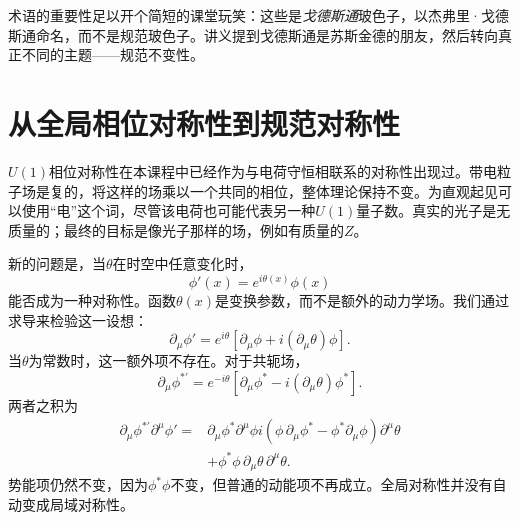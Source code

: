 术语的重要性足以开个简短的课堂玩笑：这些是\emph{戈德斯通}玻色子，以杰弗里·戈德斯通命名，而不是规范玻色子。讲义提到戈德斯通是苏斯金德的朋友，然后转向真正不同的主题——规范不变性。

\section{从全局相位对称性到规范对称性}

\(U(1)\)相位对称性在本课程中已经作为与电荷守恒相联系的对称性出现过。带电粒子场是复的，将这样的场乘以一个共同的相位，整体理论保持不变。为直观起见可以使用“电”这个词，尽管该电荷也可能代表另一种\(U(1)\)量子数。真实的光子是无质量的；最终的目标是像光子那样的场，例如有质量的\(Z\)。

新的问题是，当\(\theta\)在时空中任意变化时，
\begin{equation}
  \phi'(x)=e^{i\theta(x)}\phi(x)
  \label{eq:l07-local-u1}
\end{equation}
能否成为一种对称性。函数\(\theta(x)\)是变换参数，而不是额外的动力学场。我们通过求导来检验这一设想：
\begin{equation}
  \partial_\mu\phi'
  =e^{i\theta}
   \left[\partial_\mu\phi+i(\partial_\mu\theta)\phi\right].
  \label{eq:l07-local-derivative}
\end{equation}
当\(\theta\)为常数时，这一额外项不存在。对于共轭场，
\begin{equation}
  \partial_\mu\phi^{*\prime}
  =e^{-i\theta}
   \left[\partial_\mu\phi^*-i(\partial_\mu\theta)\phi^*\right].
\end{equation}
两者之积为
\begin{align}
  \partial_\mu\phi^{*\prime}\partial^\mu\phi'
  ={}&
  \partial_\mu\phi^*\partial^\mu\phi
  i\left(
      \phi\,\partial_\mu\phi^*
      -\phi^*\partial_\mu\phi
    \right)\partial^\mu\theta
  \nonumber\\
  &+\phi^*\phi\,
    \partial_\mu\theta\,\partial^\mu\theta.
  \label{eq:l07-local-failure}
\end{align}
势能项仍然不变，因为\(\phi^*\phi\)不变，但普通的动能项不再成立。全局对称性并没有自动变成局域对称性。

\begin{classroomqa}
\end{classroomqa}

